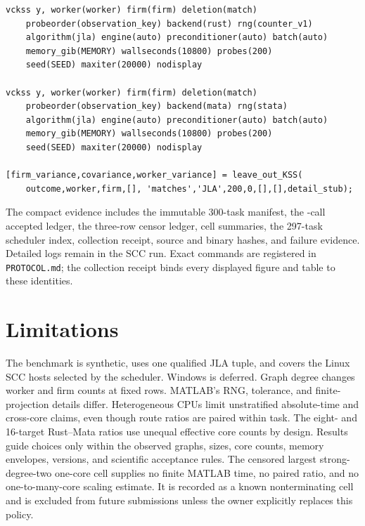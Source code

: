 \documentclass[11pt]{article}
\begin{document}
\begin{verbatim}
vckss y, worker(worker) firm(firm) deletion(match)
    probeorder(observation_key) backend(rust) rng(counter_v1)
    algorithm(jla) engine(auto) preconditioner(auto) batch(auto)
    memory_gib(MEMORY) wallseconds(10800) probes(200)
    seed(SEED) maxiter(20000) nodisplay

vckss y, worker(worker) firm(firm) deletion(match)
    probeorder(observation_key) backend(mata) rng(stata)
    algorithm(jla) engine(auto) preconditioner(auto) batch(auto)
    memory_gib(MEMORY) wallseconds(10800) probes(200)
    seed(SEED) maxiter(20000) nodisplay

[firm_variance,covariance,worker_variance] = leave_out_KSS(
    outcome,worker,firm,[], 'matches','JLA',200,0,[],[],detail_stub);
\end{verbatim}

The compact evidence includes the immutable 300-task manifest, the
\EstimatorCalls{}-call accepted ledger, the three-row censor ledger, cell
summaries, the 297-task scheduler index, collection receipt, source and binary
hashes, and failure evidence. Detailed logs remain in the SCC run. Exact
commands are registered in \texttt{PROTOCOL.md}; the collection receipt binds
every displayed figure and table to these identities.

\section{Limitations}

The benchmark is synthetic, uses one qualified JLA tuple, and covers the Linux
SCC hosts selected by the scheduler. Windows is deferred. Graph degree changes
worker and firm counts at fixed rows. MATLAB's RNG, tolerance, and finite-
projection details differ. Heterogeneous CPUs limit unstratified absolute-time
and cross-core claims, even though route ratios are paired within task. The
eight- and 16-target Rust--Mata ratios use unequal effective core counts by
design. Results guide choices only within the observed graphs, sizes, core counts, memory
envelopes, versions, and scientific acceptance rules.
The censored largest strong-degree-two one-core cell supplies no finite MATLAB
time, no paired ratio, and no one-to-many-core scaling estimate. It is recorded
as a known nonterminating cell and is excluded from future submissions unless
the owner explicitly replaces this policy.
\end{document}
